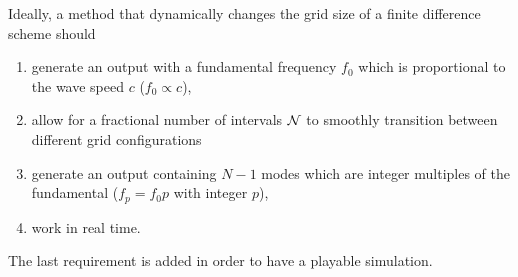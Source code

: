 
Ideally, a method that dynamically changes the grid size of a finite difference scheme should
\begin{enumerate}
    \item generate an output with a fundamental frequency $f_0$ %
    which is proportional to the wave speed $c$ ($f_0 \propto c$),
    \item allow for a fractional number of intervals $\mathcal{N}$ to smoothly transition between different grid configurations%
    \item generate an output containing $ N-1$ modes which are integer multiples of the fundamental ($f_p = f_0 p$ with integer $p$),
    \item work in real time.
\end{enumerate}
The last requirement is added in order to have a playable simulation.
%


